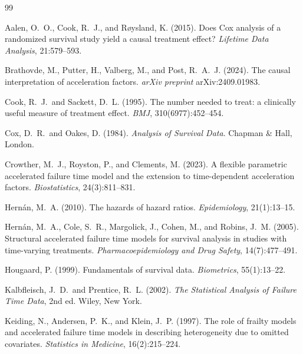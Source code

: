 \documentclass[11pt]{article}
\begin{document}
\begin{thebibliography}{99}

Aalen, O.~O., Cook, R.~J., and R{\o}ysland, K. (2015).
\newblock Does Cox analysis of a randomized survival study yield a
causal treatment effect?
\newblock \emph{Lifetime Data Analysis}, 21:579--593.

Brathovde, M., Putter, H., Valberg, M., and Post, R.~A.~J. (2024).
\newblock The causal interpretation of acceleration factors.
\newblock \emph{arXiv preprint} arXiv:2409.01983.

Cook, R.~J.\ and Sackett, D.~L. (1995).
\newblock The number needed to treat: a clinically useful measure of
treatment effect.
\newblock \emph{BMJ}, 310(6977):452--454.

Cox, D.~R.\ and Oakes, D. (1984).
\newblock \emph{Analysis of Survival Data}.
\newblock Chapman \& Hall, London.

Crowther, M.~J., Royston, P., and Clements, M. (2023).
\newblock A flexible parametric accelerated failure time model and the
extension to time-dependent acceleration factors.
\newblock \emph{Biostatistics}, 24(3):811--831.

Hern\'an, M.~A. (2010).
\newblock The hazards of hazard ratios.
\newblock \emph{Epidemiology}, 21(1):13--15.

Hern\'an, M.~A., Cole, S.~R., Margolick, J., Cohen, M., and Robins, J.~M.
(2005).
\newblock Structural accelerated failure time models for survival analysis
in studies with time-varying treatments.
\newblock \emph{Pharmacoepidemiology and Drug Safety}, 14(7):477--491.

Hougaard, P. (1999).
\newblock Fundamentals of survival data.
\newblock \emph{Biometrics}, 55(1):13--22.

Kalbfleisch, J.~D.\ and Prentice, R.~L. (2002).
\newblock \emph{The Statistical Analysis of Failure Time Data}, 2nd ed.
\newblock Wiley, New York.

Keiding, N., Andersen, P.~K., and Klein, J.~P. (1997).
\newblock The role of frailty models and accelerated failure time models
in describing heterogeneity due to omitted covariates.
\newblock \emph{Statistics in Medicine}, 16(2):215--224.


\end{thebibliography}
\end{document}
